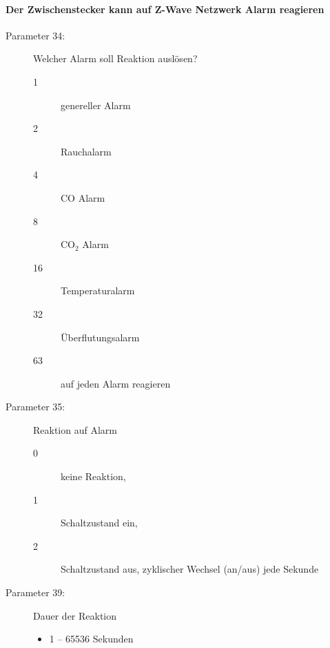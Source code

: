 \paragraph{Der Zwischenstecker kann auf Z-Wave Netzwerk Alarm reagieren}
\begin{description}
	\item [Parameter 34:] Welcher Alarm soll Reaktion auslösen?
	\begin{description}
		\item [1] genereller Alarm
		\item [2] Rauchalarm
		\item [4] CO Alarm
		\item [8] CO$_2$ Alarm
		\item [16] Temperaturalarm
		\item [32] Überflutungsalarm
		\item [63] auf jeden Alarm reagieren
	\end{description}
	\item [Parameter 35:] Reaktion auf Alarm
	\begin{description}
		\item [0] keine Reaktion,
		\item [1] Schaltzustand ein,
		\item [2] Schaltzustand aus, zyklischer Wechsel (an/aus) jede Sekunde	
	\end{description}
	\item [Parameter 39:] Dauer der Reaktion
	\begin{itemize}
		\item 1 – 65536 Sekunden
	\end{itemize}
\end{description}

